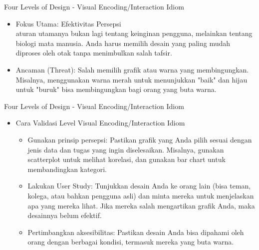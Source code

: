 \documentclass[t]{beamer}
\begin{document}
\begin{frame}{Four Levels of Design - Visual Encoding/Interaction Idiom}
	\begin{itemize}
		\item Fokus Utama: Efektivitas Persepsi \\
		aturan utamanya bukan lagi tentang keinginan pengguna, melainkan tentang biologi mata manusia. Anda harus memilih desain yang paling mudah diproses oleh otak tanpa menimbulkan salah tafsir.

		\item Ancaman (Threat): Salah memilih grafik atau warna yang membingungkan. Misalnya, menggunakan warna merah untuk menunjukkan "baik" dan hijau untuk "buruk" bisa membingungkan bagi orang yang buta warna.
	\end{itemize}
\end{frame}

\begin{frame}{Four Levels of Design - Visual Encoding/Interaction Idiom}
	\begin{itemize}
		\item Cara Validasi Level Visual Encoding/Interaction Idiom
		\begin{itemize}
			\item Gunakan prinsip persepsi: Pastikan grafik yang Anda pilih sesuai dengan jenis data dan tugas yang ingin diselesaikan. Misalnya, gunakan scatterplot untuk melihat korelasi, dan gunakan bar chart untuk membandingkan kategori.
			\item Lakukan User Study: Tunjukkan desain Anda ke orang lain (bisa teman, kolega, atau bahkan pengguna asli) dan minta mereka untuk menjelaskan apa yang mereka lihat. Jika mereka salah mengartikan grafik Anda, maka desainnya belum efektif.
			\item Pertimbangkan aksesibilitas: Pastikan desain Anda bisa dipahami oleh orang dengan berbagai kondisi, termasuk mereka yang buta warna.
		\end{itemize}
	\end{itemize}
\end{frame}
\end{document}

